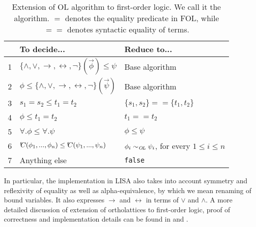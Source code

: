 \begin{table}[ht]
  \centering
  \begin{tabular}{c | l | l}
      & To decide...                                                                             & Reduce to...                                           \\
    \hline
    1 & $\lbrace \land, \lor, \rightarrow, \leftrightarrow, \neg \rbrace(\vec{\phi}) \leq \psi $ & Base algorithm                                         \\
    2 & $\phi \leq \lbrace \land, \lor, \rightarrow, \leftrightarrow, \neg \rbrace(\vec{\psi}) $ & Base algorithm                                         \\
    3 & $s_1 = s_2 \leq t_1 = t_2$                                                               & $\lbrace s_1, s_2 \rbrace == \lbrace t_1, t_2 \rbrace$ \\
    4 & $\phi \leq t_1 = t_2$                                                                    & $t_1 == t_2$                                           \\
    5 & $\forall. \phi \leq \forall. \psi$                                                       & $\phi \leq \psi$                                       \\
    6 & ${'\hspace{-0.2em}C}(\phi_1,...,\phi_n) \leq {'\hspace{-0.2em}C}(\psi_1,...,\psi_n)$                         & $\phi_i \sim_{\mathit{O{\kern-0.1em}L}} \psi_i$, for every $1 \le i \le n$    \\

    7 & Anything else                                                                            & \lstinline|false|
  \end{tabular}

  \caption{Extension of OL algorithm to first-order logic. We call it the \FOLalg{} algorithm. $=$ denotes the equality predicate in FOL, while $==$ denotes syntactic equality of terms.
    \label{tab:Olextension}}
\end{table}


In particular, the implementation in LISA also takes into account symmetry and reflexivity of equality as well as alpha-equivalence, by which we mean renaming of bound variables. It also expresses $\rightarrow$ and $\leftrightarrow$ in terms of $\lor$ and $\land$.
A more detailed discussion of extension of ortholattices to first-order logic, proof of correctness and implementation details can be found in \cite{guilloudFormulaNormalizationsVerification2023} and \cite{guilloudLISAModernProof2023}.




